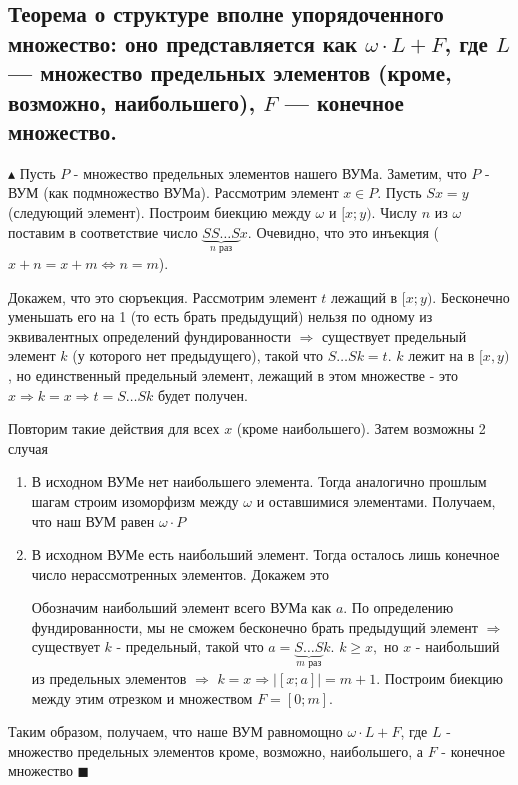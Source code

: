 \subsection{Теорема о структуре вполне упорядоченного множество: оно представляется как $\omega \cdot L + F$, где $L$ — множество предельных элементов (кроме, возможно, наибольшего), $F$ — конечное множество.}

\par $\blacktriangle$ Пусть $P$ - множество предельных элементов нашего ВУМа. Заметим, что $P$ - ВУМ (как подмножество ВУМа). Рассмотрим элемент $x \in P$. Пусть $Sx=y$ (следующий элемент). Построим биекцию между $\omega$ и $[x; y)$. Числу $n$ из $\omega$ поставим в соответствие число $\underbrace{SS\ldots S}_\text{$n$ раз}x$. Очевидно, что это инъекция ($x+n=x+m \Leftrightarrow n=m$).
\par Докажем, что это сюръекция. Рассмотрим элемент $t$ лежащий в $[x;y)$. Бесконечно уменьшать его на 1 (то есть брать предыдущий) нельзя по одному из эквивалентных определений фундированности $\Rightarrow$ существует предельный элемент $k$ (у которого нет предыдущего), такой что  $S\ldots Sk=t$. $k$ лежит на в $[x,y)$, но единственный предельный элемент, лежащий в этом множестве - это $x \Rightarrow k=x \Rightarrow t=S\ldots Sk$ будет получен. 
\par Повторим такие действия для всех $x$ (кроме наибольшего). Затем возможны 2 случая
\begin{enumerate}
    \item В исходном ВУМе нет наибольшего элемента. Тогда аналогично прошлым шагам строим изоморфизм между $\omega$ и оставшимися элементами. Получаем, что наш ВУМ равен $\omega \cdot P$
    \item В исходном ВУМе есть наибольший элемент. Тогда осталось лишь конечное число нерассмотренных элементов. Докажем это
    \par Обозначим наибольший элемент всего ВУМа как $a$. По определению фундированности, мы не сможем бесконечно брать предыдущий элемент $\Rightarrow$ существует $k$ - предельный, такой что $a=\underbrace{S\ldots S}_\text{$m$ раз}k$. $k \geq x,$ но $x$ - наибольший из предельных элементов $\Rightarrow$ $k=x \Rightarrow |[x;a]|=m+1$. Построим биекцию между этим отрезком и множеством $F=[0;m]$.
\end{enumerate}

\par Таким образом, получаем, что наше ВУМ равномощно $\omega \cdot L + F$, где $L$ - множество предельных элементов кроме, возможно, наибольшего, а $F$ - конечное множество $\blacksquare$